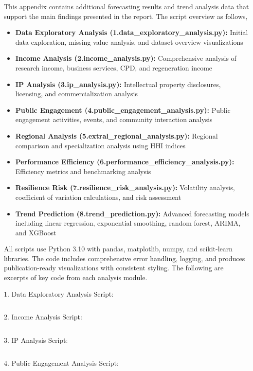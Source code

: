 \documentclass[journal,onecolumn, 10pt,draftclsnofoot]{IEEEtran}
\begin{document}
This appendix contains additional forecasting results and trend analysis data that support the main findings presented in the report. The script overview as follows,
\begin{itemize}
    \item \textbf{Data Exploratory Analysis (1.data\_exploratory\_analysis.py):} Initial data exploration, missing value analysis, and dataset overview visualizations
    \item \textbf{Income Analysis (2.income\_analysis.py):} Comprehensive analysis of research income, business services, CPD, and regeneration income
    \item \textbf{IP Analysis (3.ip\_analysis.py):} Intellectual property disclosures, licensing, and commercialization analysis
    \item \textbf{Public Engagement (4.public\_engagement\_analysis.py):} Public engagement activities, events, and community interaction analysis
    \item \textbf{Regional Analysis (5.extral\_regional\_analysis.py):} Regional comparison and specialization analysis using HHI indices
    \item \textbf{Performance Efficiency (6.performance\_efficiency\_analysis.py):} Efficiency metrics and benchmarking analysis
    \item \textbf{Resilience Risk (7.resilience\_risk\_analysis.py):} Volatility analysis, coefficient of variation calculations, and risk assessment
    \item \textbf{Trend Prediction (8.trend\_prediction.py):} Advanced forecasting models including linear regression, exponential smoothing, random forest, ARIMA, and XGBoost
\end{itemize}

All scripts use Python 3.10 with pandas, matplotlib, numpy, and scikit-learn libraries. The code includes comprehensive error handling, logging, and produces publication-ready visualizations with consistent styling. The following are excerpts of key code from each analysis module.

1. Data Exploratory Analysis Script:
\inputminted{python}{Code/1.data_exploratory_analysis.py}

2. Income Analysis Script:
\inputminted{python}{Code/2.income_analysis.py}

3. IP Analysis Script:
\inputminted{python}{Code/3.ip_analysis.py}

4. Public Engagement Analysis Script:
\inputminted{python}{Code/4.public_engagement_analysis.py}
\end{document}
